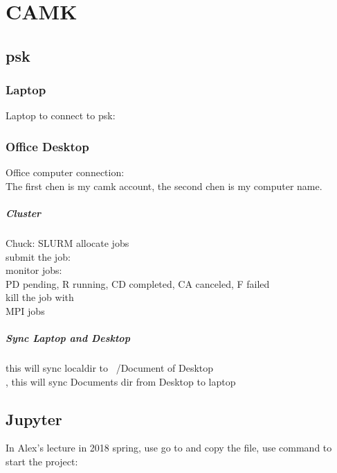 
\chapter{CAMK}
\section{psk}
\subsection{Laptop}
Laptop to connect to psk: 
\subsection{Office Desktop}
Office computer connection: \\
The first chen is my camk account, the second chen is my computer name. 

\paragraph{Cluster}

Chuck: SLURM  allocate jobs
\\
submit the job: \\
monitor jobs: 
\\
PD pending, R running, CD completed, CA canceled, F failed\\
kill the job with 
\\
MPI jobs
\\

\paragraph{Sync Laptop and Desktop}
 this will sync localdir to ~/Document of Desktop
\\
, this will sync Documents dir from Desktop to laptop

\section{Jupyter}
In Alex's lecture in 2018 spring, use  go to  and copy the file, use command to start the project: \\

